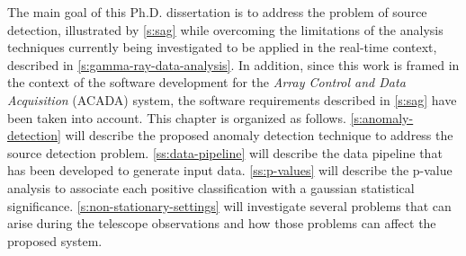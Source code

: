 \begin{chapabstract}
\small{
The main goal of this Ph.D. dissertation is to address the problem of source detection, illustrated by \autoref{s:sag} while overcoming the limitations of the analysis techniques currently being investigated to be applied in the real-time context, described in \autoref{s:gamma-ray-data-analysis}. In addition, since this work is framed in the context of the software development for the \textit{Array Control and Data Acquisition} (ACADA) system, the software requirements described in \autoref{s:sag} have been taken into account. This chapter is organized as follows. 
\autoref{s:anomaly-detection} will describe the proposed anomaly detection technique to address the source detection problem. \autoref{ss:data-pipeline} will describe the data pipeline that has been developed to generate input data. \autoref{ss:p-values} will describe the p-value analysis to associate each positive classification with a gaussian statistical significance. \autoref{s:non-stationary-settings} will investigate several problems that can arise during the telescope observations and how those problems can affect the proposed system. 
}\\
\begin{center}
\noindent\makebox[0.8\linewidth]{\rule{0.66\paperwidth}{0.4pt}}
\end{center}
\vspace{1cm}
\end{chapabstract}
